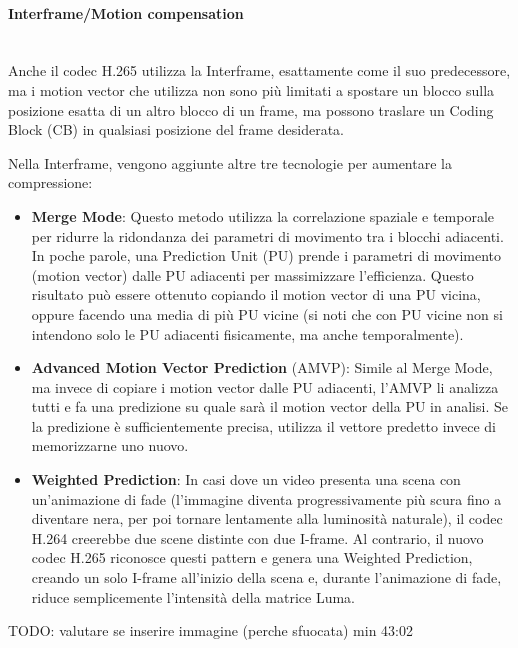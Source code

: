 \documentclass[a4paper,12pt, oneside]{article}
\begin{document}
\paragraph{Interframe/Motion compensation}\hphantom{A}\\
Anche il codec H.265 utilizza la Interframe, esattamente come il suo predecessore, ma i motion vector che
utilizza non sono più limitati a spostare un blocco sulla posizione esatta di un altro blocco di un frame,
ma possono traslare un Coding Block (CB) in qualsiasi posizione del frame desiderata.

Nella Interframe, vengono aggiunte altre tre tecnologie per aumentare la compressione:

\begin{itemize}
    \item \textbf{Merge Mode}: Questo metodo utilizza la correlazione spaziale e temporale per ridurre la
    ridondanza dei parametri di movimento tra i blocchi adiacenti. In poche parole, una Prediction Unit
    (PU) prende i parametri di movimento (motion vector) dalle PU adiacenti per massimizzare l'efficienza.
    Questo risultato può essere ottenuto copiando il motion vector di una PU vicina, oppure facendo una
    media di più PU vicine (si noti che con PU vicine non si intendono solo le PU adiacenti fisicamente, ma
    anche temporalmente).
    \item \textbf{Advanced Motion Vector Prediction} (AMVP): Simile al Merge Mode, ma invece di copiare i
    motion vector dalle PU adiacenti, l'AMVP li analizza tutti e fa una predizione su quale sarà il motion
    vector della PU in analisi. Se la predizione è sufficientemente precisa, utilizza il vettore predetto
    invece di memorizzarne uno nuovo.
    \item \textbf{Weighted Prediction}: In casi dove un video presenta una scena con un'animazione di fade
    (l'immagine diventa progressivamente più scura fino a diventare nera, per poi tornare lentamente alla
    luminosità naturale), il codec H.264 creerebbe due scene distinte con due I-frame. Al contrario, il
    nuovo codec H.265 riconosce questi pattern e genera una Weighted Prediction, creando un solo I-frame
    all'inizio della scena e, durante l'animazione di fade, riduce semplicemente l'intensità della matrice
    Luma.
\end{itemize}

TODO: valutare se inserire immagine (perche sfuocata) min 43:02
\end{document}
